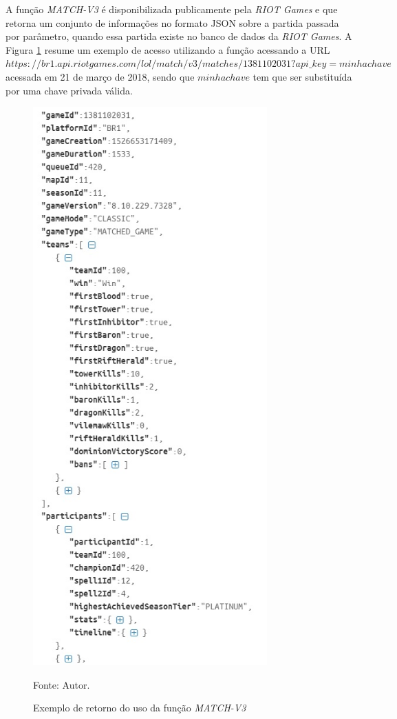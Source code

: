 A função \textit{MATCH-V3} é disponibilizada publicamente pela \textit{RIOT Games} e que retorna um conjunto de informações no formato JSON sobre a partida passada por parâmetro, quando essa partida existe no banco de dados da \textit{RIOT Games}. A Figura \ref{fig:match-v3} resume um exemplo de acesso utilizando a função acessando a URL  
\(https://br1.api.riotgames.com/lol/match/v3/matches/1381102031?api\_key=minhachave\) acessada em 21 de março de 2018, sendo que \(minhachave\) tem que ser substituída por uma chave privada válida.
\begin{figure}[!ht]
	\caption{Exemplo de retorno do uso da função \textit{MATCH-V3}}
	\begin{center}
		\includegraphics[width=9cm]{imagens/match-v3.jpg}
	\end{center}
	\small{Fonte: Autor.}
	\label{fig:match-v3}
\end{figure}

